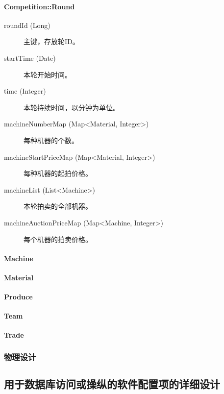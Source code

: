 \documentclass{article}
\begin{document}
\paragraph{Competition::Round}
\begin{description}
  \item[roundId (Long)] 主键，存放轮ID。
  \item[startTime (Date)] 本轮开始时间。
  \item[time (Integer)] 本轮持续时间，以分钟为单位。
  \item[machineNumberMap (Map<Material, Integer>)] 每种机器的个数。
  \item[machineStartPriceMap (Map<Material, Integer>)] 每种机器的起拍价格。
  \item[machineList (List<Machine>)] 本轮拍卖的全部机器。
  \item[machineAuctionPriceMap (Map<Machine, Integer>)] 每个机器的拍卖价格。
\end{description}

\paragraph{Machine}

\paragraph{Material}

\paragraph{Produce}

\paragraph{Team}

\paragraph{Trade}

\subsubsection{物理设计}

\subsection{用于数据库访问或操纵的软件配置项的详细设计}
\end{document}
